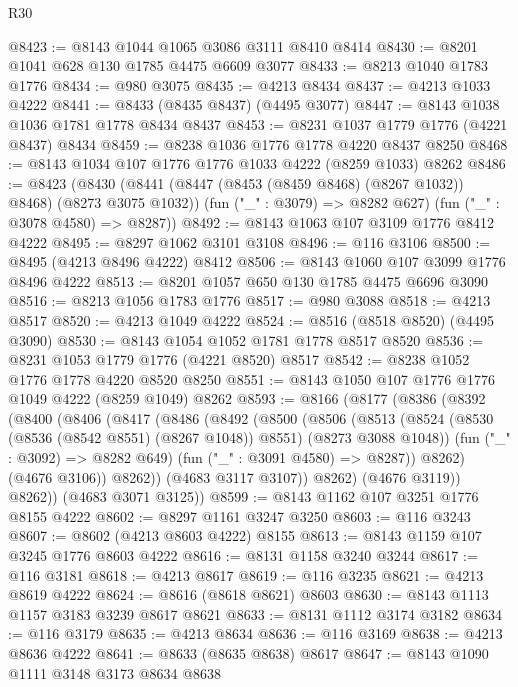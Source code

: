 \begin{lexlean}{R30}
\begin{coremodule}
{{{{{@8423 := @8143 @1044 @1065 @3086 @3111 @8410 @8414
@8430 := @8201 @1041 @628 @130 @1785 @4475 @6609 @3077
@8433 := @8213 @1040 @1783 @1776
@8434 := @980 @3075
@8435 := @4213 @8434
@8437 := @4213 @1033 @4222
@8441 := @8433 (@8435 @8437) (@4495 @3077)
@8447 := @8143 @1038 @1036 @1781 @1778 @8434 @8437
@8453 := @8231 @1037 @1779 @1776 (@4221 @8437) @8434
@8459 := @8238 @1036 @1776 @1778 @4220 @8437 @8250
@8468 := @8143 @1034 @107 @1776 @1776 @1033 @4222 (@8259 @1033) @8262
@8486 := @8423
    (@8430
      (@8441 (@8447 (@8453 (@8459 @8468) (@8267 @1032)) @8468) (@8273 @3075 @1032))
      (fun ("_" : @3079) => @8282 @627)
      (fun ("_" : @3078 @4580) => @8287))
@8492 := @8143 @1063 @107 @3109 @1776 @8412 @4222
@8495 := @8297 @1062 @3101 @3108
@8496 := @116 @3106
@8500 := @8495 (@4213 @8496 @4222) @8412
@8506 := @8143 @1060 @107 @3099 @1776 @8496 @4222
@8513 := @8201 @1057 @650 @130 @1785 @4475 @6696 @3090
@8516 := @8213 @1056 @1783 @1776
@8517 := @980 @3088
@8518 := @4213 @8517
@8520 := @4213 @1049 @4222
@8524 := @8516 (@8518 @8520) (@4495 @3090)
@8530 := @8143 @1054 @1052 @1781 @1778 @8517 @8520
@8536 := @8231 @1053 @1779 @1776 (@4221 @8520) @8517
@8542 := @8238 @1052 @1776 @1778 @4220 @8520 @8250
@8551 := @8143 @1050 @107 @1776 @1776 @1049 @4222 (@8259 @1049) @8262
@8593 := @8166
    (@8177
      (@8386
        (@8392
          (@8400
            (@8406
              (@8417
                (@8486
                  (@8492
                    (@8500
                      (@8506
                        (@8513
                          (@8524
                            (@8530 (@8536 (@8542 @8551) (@8267 @1048)) @8551)
                            (@8273 @3088 @1048))
                          (fun ("_" : @3092) => @8282 @649)
                          (fun ("_" : @3091 @4580) => @8287))
                        @8262)
                      (@4676 @3106))
                    @8262))
                (@4683 @3117 @3107))
              @8262)
            (@4676 @3119))
          @8262))
      (@4683 @3071 @3125))
@8599 := @8143 @1162 @107 @3251 @1776 @8155 @4222
@8602 := @8297 @1161 @3247 @3250
@8603 := @116 @3243
@8607 := @8602 (@4213 @8603 @4222) @8155
@8613 := @8143 @1159 @107 @3245 @1776 @8603 @4222
@8616 := @8131 @1158 @3240 @3244
@8617 := @116 @3181
@8618 := @4213 @8617
@8619 := @116 @3235
@8621 := @4213 @8619 @4222
@8624 := @8616 (@8618 @8621) @8603
@8630 := @8143 @1113 @1157 @3183 @3239 @8617 @8621
@8633 := @8131 @1112 @3174 @3182
@8634 := @116 @3179
@8635 := @4213 @8634
@8636 := @116 @3169
@8638 := @4213 @8636 @4222
@8641 := @8633 (@8635 @8638) @8617
@8647 := @8143 @1090 @1111 @3148 @3173 @8634 @8638
}}}}}
\end{coremodule}
\end{lexlean}
